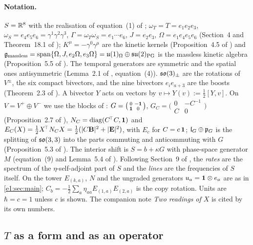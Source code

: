 \paragraph{Notation.} $S=\mathbb{R}^8$ with the realisation of equation~(1) of \cite{ES17}; $\omega_T=T=e_1e_2e_3$, $\omega_S=e_4e_5e_6=\gamma^1\gamma^2\gamma^3$,
$\Gamma=\omega_T\omega_S=e_1\cdots e_6$, $J=e_2e_3$, $\Omega=e_1e_4e_5e_6$ (Section~4 and Theorem~18.1 of \cite{ES17}); $K^\mu=-\gamma^0\gamma^\mu$ are the kinetic kernels
(Proposition~4.5 of \cite{ES17}) and $\mathfrak g_{\rm massless}=\operatorname{span}\{\Omega,J,e_2\Omega,e_3\Omega\}=\mathfrak{u}(1)_\Omega\oplus\mathfrak{su}(2)_{\rm PG}$ is the
massless kinetic algebra (Proposition~5.5 of \cite{ES17}). The temporal generators are symmetric and the spatial ones antisymmetric
(Lemma~2.1 of \cite{ES17}, equation~(4)). $\mathfrak{so}(3)_\pm$ are the rotations of $V^\pm$, the six compact bivectors, and the nine bivectors $e_ie_{a+3}$ are the
boosts (Theorem~2.3 of \cite{ES17}). A bivector $Y$ acts on vectors by $v\mapsto Y(v):=\tfrac12[Y,v]$. On $V=V^+\oplus V^-$ we use the blocks of \cite{RE}: $G=\bigl(\begin{smallmatrix}0&-\mathbf 1\\ \mathbf 1&0\end{smallmatrix}\bigr)$,
$G_C=\bigl(\begin{smallmatrix}0&-C^{-1}\\ C&0\end{smallmatrix}\bigr)$ (Proposition~2.7 of \cite{RE}), $N_C=\operatorname{diag}(C^{\!\top}C,\mathbf 1)$ and
$E_C(X)=\tfrac12X^{\!\top}N_CX=\tfrac12(|C\mathbf B|^2+|\mathbf E|^2)$, with $E_c$ for $C=c\,\mathbf 1$; $\mathfrak l_G\oplus\mathfrak p_G$ is the splitting of $\mathfrak{so}(3,3)$ into the
parts commuting and anticommuting with $G$ (Proposition~5.3 of \cite{RE}). The interior shift is $S=b+\kappa G$ with phase-space generator $M$
(equation~(9) and Lemma~5.4 of \cite{RE}). Following Section~9 of \cite{RE}, the \emph{rates} are the spectrum of the $\eta$-self-adjoint part of
$S$ and the \emph{lines} are the frequencies of $S$ itself. On the tower $E_{(k,a)}$, $N$ and the ungraded generators $u_a=\mathbf 1\otimes e_a$ are as in
\cref{e1:sec:main}; $C_b=-\tfrac12\sum_a\eta_{aa}E_{(1,a)}E_{(2,a)}$ is the copy rotation. Units are $\hbar=c=1$ unless $c$ is shown. The companion
note \emph{Two readings of $X$} \cite{TR} is cited by its own numbers.

\subsection{\texorpdfstring{$T$ as a form and as an operator}{T as a form and as an operator}}
\label{e6:sec:Tform}

